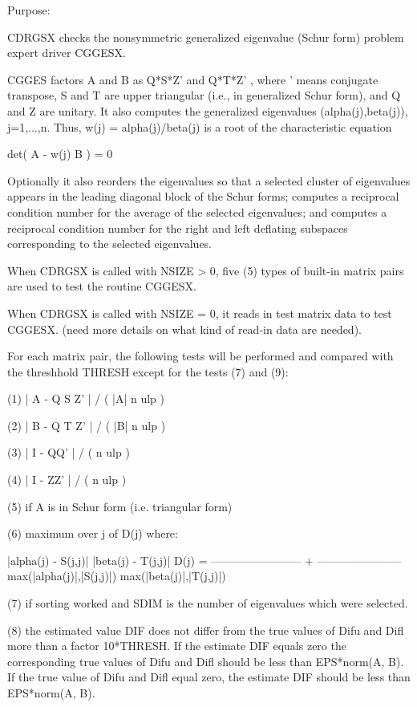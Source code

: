 \begin{DoxyParagraph}{Purpose\+: }
\begin{DoxyVerb} CDRGSX checks the nonsymmetric generalized eigenvalue (Schur form)
 problem expert driver CGGESX.

 CGGES factors A and B as Q*S*Z'  and Q*T*Z' , where ' means conjugate
 transpose, S and T are  upper triangular (i.e., in generalized Schur
 form), and Q and Z are unitary. It also computes the generalized
 eigenvalues (alpha(j),beta(j)), j=1,...,n.  Thus,
 w(j) = alpha(j)/beta(j) is a root of the characteristic equation

                 det( A - w(j) B ) = 0

 Optionally it also reorders the eigenvalues so that a selected
 cluster of eigenvalues appears in the leading diagonal block of the
 Schur forms; computes a reciprocal condition number for the average
 of the selected eigenvalues; and computes a reciprocal condition
 number for the right and left deflating subspaces corresponding to
 the selected eigenvalues.

 When CDRGSX is called with NSIZE > 0, five (5) types of built-in
 matrix pairs are used to test the routine CGGESX.

 When CDRGSX is called with NSIZE = 0, it reads in test matrix data
 to test CGGESX.
 (need more details on what kind of read-in data are needed).

 For each matrix pair, the following tests will be performed and
 compared with the threshhold THRESH except for the tests (7) and (9):

 (1)   | A - Q S Z' | / ( |A| n ulp )

 (2)   | B - Q T Z' | / ( |B| n ulp )

 (3)   | I - QQ' | / ( n ulp )

 (4)   | I - ZZ' | / ( n ulp )

 (5)   if A is in Schur form (i.e. triangular form)

 (6)   maximum over j of D(j)  where:

                     |alpha(j) - S(j,j)|        |beta(j) - T(j,j)|
           D(j) = ------------------------ + -----------------------
                  max(|alpha(j)|,|S(j,j)|)   max(|beta(j)|,|T(j,j)|)

 (7)   if sorting worked and SDIM is the number of eigenvalues
       which were selected.

 (8)   the estimated value DIF does not differ from the true values of
       Difu and Difl more than a factor 10*THRESH. If the estimate DIF
       equals zero the corresponding true values of Difu and Difl
       should be less than EPS*norm(A, B). If the true value of Difu
       and Difl equal zero, the estimate DIF should be less than
       EPS*norm(A, B).


\end{DoxyVerb}
\end{DoxyParagraph}
